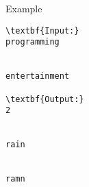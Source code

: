Example
\begin{verbatim}
\textbf{Input:}
programming


entertainment

\textbf{Output:}
2


rain


ramn \end{verbatim}